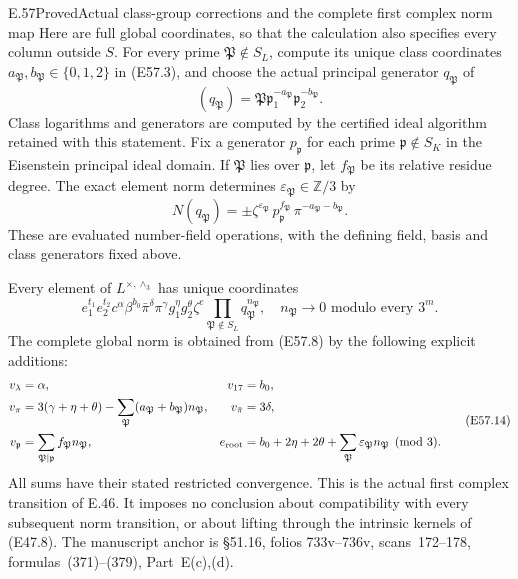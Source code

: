 \begin{statement}{E.57}{Proved}{Actual class-group corrections and the complete first complex norm map}
Here are full global coordinates, so that the
calculation also specifies every column outside
$S$. For every prime $\mathfrak P\notin S_L$,
compute its unique class coordinates
$a_{\mathfrak P},b_{\mathfrak P}\in\{0,1,2\}$
in (E57.3), and choose the actual principal
generator $q_{\mathfrak P}$ of
\[
 (q_{\mathfrak P})=
       \mathfrak P\mathfrak p_1^{-a_{\mathfrak P}}
                         \mathfrak p_2^{-b_{\mathfrak P}} .
 \tag{E57.11}
\]
Class logarithms and generators are computed by
the certified ideal algorithm retained with
this statement. Fix a generator
$p_{\mathfrak p}$ for each prime
$\mathfrak p\notin S_K$ in the Eisenstein
principal ideal domain. If $\mathfrak P$ lies
over $\mathfrak p$, let $f_{\mathfrak P}$ be its
relative residue degree. The exact element
norm determines $\varepsilon_{\mathfrak P}\in\mathbb Z/3$ by
\[
 N(q_{\mathfrak P})
       =\pm\zeta^{\varepsilon_{\mathfrak P}}\,
          p_{\mathfrak p}^{f_{\mathfrak P}}\,
          \pi^{-a_{\mathfrak P}-b_{\mathfrak P}} .
 \tag{E57.12}
\]
These are evaluated number-field operations,
with the defining field, basis and class
generators fixed above.

Every element of $L^{\times,\wedge_3}$ has
unique coordinates
\[
 e_1^{t_1}e_2^{t_2}c^\alpha\beta^{b_0}
       \bar\pi^\delta\pi^\gamma g_1^\eta g_2^\theta
       \zeta^e\prod_{\mathfrak P\notin S_L}
                                      q_{\mathfrak P}^{n_{\mathfrak P}},
 \quad n_{\mathfrak P}\longrightarrow0
                       \text{ modulo every }3^m .
 \tag{E57.13}
\]
The complete global norm is obtained from
(E57.8) by the following explicit additions:
\[
 \begin{aligned}
 v_\lambda&=\alpha,& v_{17}&=b_0,\\
 v_\pi&=3(\gamma+\eta+\theta)
             -\sum_{\mathfrak P}(a_{\mathfrak P}+b_{\mathfrak P})
                                                   n_{\mathfrak P},
 &v_{\bar\pi}&=3\delta,\\
 v_{\mathfrak p}&=\sum_{\mathfrak P\mid\mathfrak p}
                                 f_{\mathfrak P}n_{\mathfrak P},&
 e_{\rm root}&=b_0+2\eta+2\theta+
                \sum_{\mathfrak P}\varepsilon_{\mathfrak P}
                                    n_{\mathfrak P}\pmod3 .
 \end{aligned}
 \tag{E57.14}
\]
All sums have their stated restricted convergence.
This is the actual first complex transition of
E.46. It imposes no conclusion about compatibility
with every subsequent norm transition, or about
lifting through the intrinsic kernels of (E47.8).
The manuscript anchor is \S51.16, folios
733v--736v, scans~172--178, formulas~(371)--(379),
Part~E(c),(d).
\end{statement}

